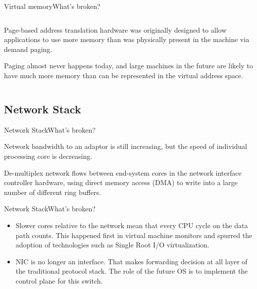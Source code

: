 \documentclass[10pt]{beamer}
\begin{document}
\begin{frame}{Virtual memory}{What's broken?}
\begin{columns}[T]
    \hfill
    \begin{column}{.8\textwidth}
      \begin{block}{}
        Page-based address translation hardware was originally designed to
        allow applications to use more memory than was physically present in
        the machine via demand paging.
      \end{block}\pause

      \begin{block}{}
        Paging almost never happens today, and large machines in the future
        are likely to have much more memory than can be represented in the
        virtual address space.
      \end{block}
    \end{column}
  \end{columns}
\end{frame}

\subsection{Network Stack}
\begin{frame}{Network Stack}{What's broken?}
  \begin{block}{}
    Network bandwidth to an adaptor is still increasing, but the speed of
    individual processing core is decreasing. \pause
  \end{block}

  \begin{block}{}
    De-multiplex network flows between end-system cores in the network
    interface controller hardware, using direct memory access (DMA) to write
    into a large number of different ring buffers.
  \end{block}

\end{frame}

\begin{frame}{Network Stack}{What's broken?}
  \begin{itemize}
    \item Slower cores relative to the network mean that every CPU cycle on the
          data path counts. This happened first in virtual machine monitors and
          spurred the adoption of technologies such as Single Root I/O
          virtualization. \pause
    \item NIC is no longer an interface. That makes forwarding decision at all
          layer of the traditional protocol stack. The role of the future OS is
          to implement the control plane for this switch.
  \end{itemize}
\end{frame}
\end{document}
